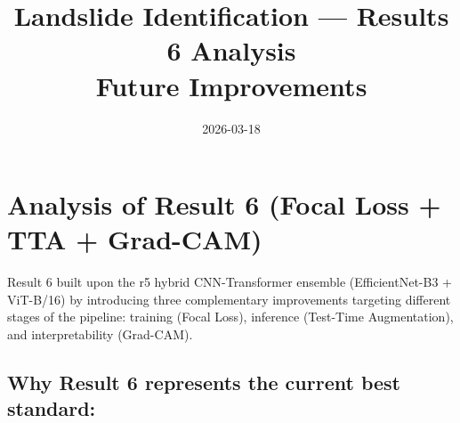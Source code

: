 \documentclass[11pt]{article}
\title{Landslide Identification --- Results 6 Analysis \\ \large Future Improvements}
\author{}
\date{2026-03-18}
\begin{document}
\maketitle

\section{Analysis of Result 6 (Focal Loss + TTA + Grad-CAM)}

Result 6 built upon the r5 hybrid CNN-Transformer ensemble (EfficientNet-B3 + ViT-B/16) by introducing three complementary improvements targeting different stages of the pipeline: training (Focal Loss), inference (Test-Time Augmentation), and interpretability (Grad-CAM).

\subsection{Why Result 6 represents the current best standard:}
\end{document}

